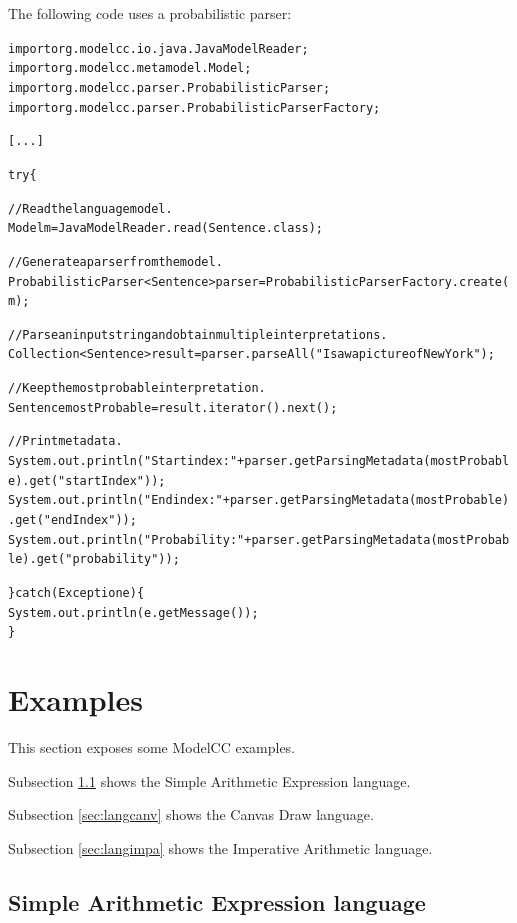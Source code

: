 \documentclass[a4paper,twoside,onecolumn]{article}
\newenvironment{colframe}{%
  \begin{Sbox} 
    \begin{minipage}{.8\columnwidth} 
}{%

  \end{minipage} 
  \end{Sbox} 
  \begin{center} 
    \fcolorbox{black}{MyGray}{\TheSbox} 
  \end{center} 
}
\begin{document}
The following code uses a probabilistic parser:

\begin{colframe}
\begin{alltt}
import org.modelcc.io.java.JavaModelReader;
import org.modelcc.metamodel.Model;
import org.modelcc.parser.ProbabilisticParser;
import org.modelcc.parser.ProbabilisticParserFactory;

[...]

try \{

  // Read the language model.
  Model m = JavaModelReader.read(Sentence.class);

  // Generate a parser from the model.
  ProbabilisticParser<Sentence> parser = ProbabilisticParserFactory.create(m);

  // Parse an input string and obtain multiple interpretations.
  Collection<Sentence> result = parser.parseAll("I saw a picture of New York");

  // Keep the most probable interpretation.
  Sentence mostProbable = result.iterator().next();

  // Print metadata.
  System.out.println("Start index: "+parser.getParsingMetadata(mostProbable).get("startIndex"));
  System.out.println("End index: "+parser.getParsingMetadata(mostProbable).get("endIndex"));
  System.out.println("Probability: "+parser.getParsingMetadata(mostProbable).get("probability"));

\} catch (Exception e) \{
  System.out.println(e.getMessage());
\}
\end{alltt}
\end{colframe}


\section{Examples} \label{sec:examples}

This section exposes some ModelCC examples.

Subsection \ref{sec:langsae} shows the Simple Arithmetic Expression language.

Subsection \ref{sec:langcanv} shows the Canvas Draw language.

Subsection \ref{sec:langimpa} shows the Imperative Arithmetic language.

\subsection{Simple Arithmetic Expression language} \label{sec:langsae}
\end{document}
